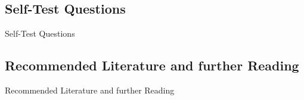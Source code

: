 

\subsection{Self-Test Questions}

\begin{frame}{Self-Test Questions}{}

\end{frame}


\subsection{Recommended Literature and further Reading}

\begin{frame}{Recommended Literature and further Reading}{}
	\footnotesize
	\begin{thebibliography}{2}

	\end{thebibliography}
\end{frame}


\makethanks

